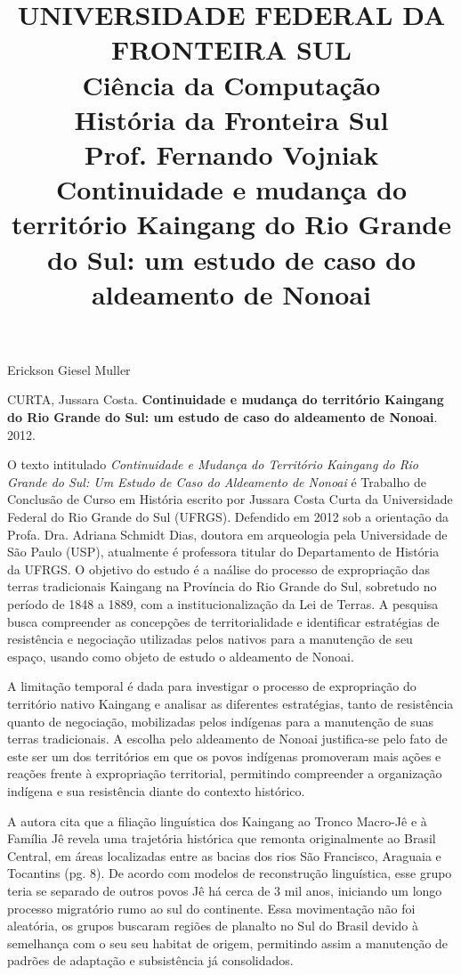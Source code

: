 \documentclass[12pt, a4paper]{article}
\title{UNIVERSIDADE FEDERAL DA FRONTEIRA SUL\\Ciência da Computação\\História da Fronteira Sul\\Prof. Fernando Vojniak\\Continuidade e mudança do território Kaingang do Rio Grande do Sul: um estudo de caso do aldeamento de Nonoai}
\date{}
\begin{document}
\maketitle

\begin{flushright}
	Erickson Giesel Muller
\end{flushright}

	CURTA, Jussara Costa. \textbf{Continuidade e mudança do território Kaingang do Rio Grande do Sul: um estudo de caso do aldeamento de Nonoai}. 2012.
	\\
\thispagestyle{empty} %

	O texto intitulado \textit{Continuidade e Mudança do Território Kaingang do Rio Grande do Sul: Um Estudo de Caso do Aldeamento de Nonoai} é Trabalho de Conclusão de Curso em História escrito por Jussara Costa Curta da Universidade Federal do Rio Grande do Sul (UFRGS). Defendido em 2012 sob a orientação da Profa. Dra. Adriana Schmidt Dias, doutora em arqueologia pela Universidade de São Paulo (USP), atualmente é professora titular do Departamento de História da UFRGS. O objetivo do estudo é a naálise do processo de expropriação das terras tradicionais Kaingang na Província do Rio Grande do Sul, sobretudo no período de 1848 a 1889, com a institucionalização da Lei de Terras. A pesquisa busca compreender as concepções de territorialidade e identificar estratégias de resistência e negociação utilizadas pelos nativos para a manutenção de seu espaço, usando como objeto de estudo o aldeamento de Nonoai.

A limitação temporal é dada para investigar o processo de expropriação do território nativo Kaingang e analisar as diferentes estratégias, tanto de resistência quanto de negociação, mobilizadas pelos indígenas para a manutenção de suas terras tradicionais. A escolha pelo aldeamento de Nonoai justifica-se pelo fato de este ser um dos territórios em que os povos indígenas promoveram mais ações e reações frente à expropriação territorial, permitindo compreender a organização indígena e sua resistência diante do contexto histórico.

A autora cita que a filiação linguística dos Kaingang ao Tronco Macro-Jê e à Família Jê revela uma trajetória histórica que remonta originalmente ao Brasil Central, em áreas localizadas entre as bacias dos rios São Francisco, Araguaia e Tocantins (pg. 8). De acordo com modelos de reconstrução linguística, esse grupo teria se separado de outros povos Jê há cerca de 3 mil anos, iniciando um longo processo migratório rumo ao sul do continente. Essa movimentação não foi aleatória, os grupos buscaram regiões de planalto no Sul do Brasil devido à semelhança com o seu seu habitat de origem, permitindo assim a manutenção de padrões de adaptação e subsistência já consolidados.
\end{document}
